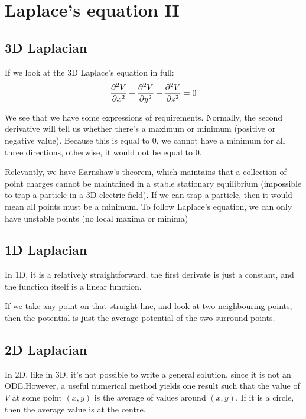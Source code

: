 \documentclass[12pt,chapterprefix=false,dvipsnames]{scrbook}
\theoremstyle{dotless}
\theoremstyle{definition}
\begin{document}
\section{Laplace's equation II}%
\label{sec:laplace_s_equation_ii}

\subsection{3D Laplacian}%
\label{sub:3d_laplacian}

If we look at the 3D Laplace's equation in full:
\begin{equation}
	\label{eq:3D_laplace_s_equation_in_full}
	\pdv[2]{V}{x} + \pdv[2]{V}{y} +
	\pdv[2]{V}{z} = 0
\end{equation}

We see that we have some expressions of requirements. Normally,
the second derivative will tell us whether there's a maximum or
minimum (positive or negative value). Because this is equal to
0, we cannot have a minimum for all three directions, otherwise,
it would not be equal to 0.

Relevantly, we have Earnshaw's theorem, which maintains that a
collection of point charges cannot be maintained in a stable
stationary equilibrium (impossible to trap a particle in a 3D
electric field). If we can trap a particle, then it would mean
all points must be a minimum. To follow Laplace's equation, we
can only have unstable points (no local maxima or minima)

\subsection{1D Laplacian}%
\label{sub:1d_laplacian}

In 1D, it is a relatively straightforward, the first derivate is
just a constant, and the function itself is a linear function.

If we take any point on that straight line, and look at two
neighbouring points, then the potential is just the average
potential of the two surround points.

\subsection{2D Laplacian}%
\label{sub:2d_laplacian}

In 2D, like in 3D, it's not possible to write a general
solution, since it is not an ODE.\@ However, a useful numerical
method yields one result such that the value of
$V$ at some point $(x,y)$ is
the average of values around $(x,y)$. If it is a
circle, then the average value is at the centre.
\end{document}
